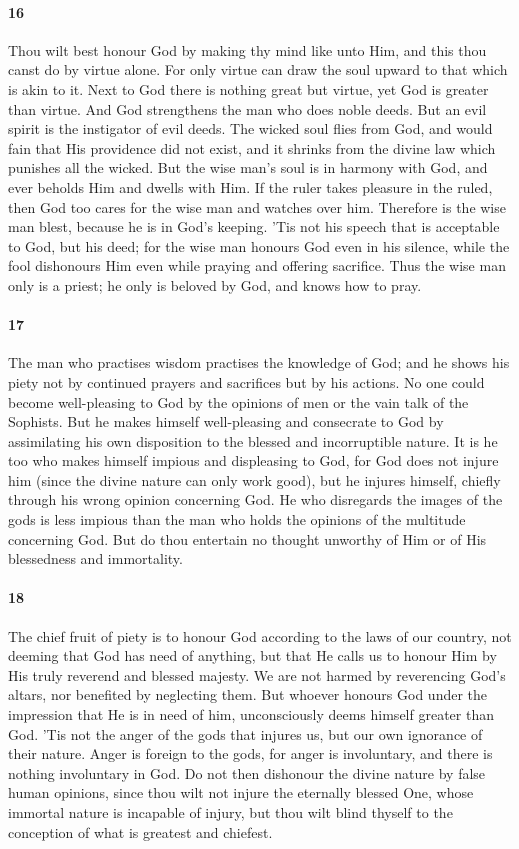 \documentclass[12pt]{article}
\begin{document}
\paragraph{16} Thou wilt best honour God by making thy mind like unto Him, and
this thou canst do by virtue alone. For only virtue can draw the soul upward to
that which is akin to it. Next to God there is nothing great but virtue, yet
God is greater than virtue. And God strengthens the man who does noble deeds.
But an evil spirit is the instigator of evil deeds. The wicked soul flies from
God, and would fain that His providence did not exist, and it shrinks from the
divine law which punishes all the wicked. But the wise man's soul is in harmony
with God, and ever beholds Him and dwells with Him. If the ruler takes pleasure
in the ruled, then God too cares for the wise man and watches over him.
Therefore is the wise man blest, because he is in God's keeping. 'Tis not his
speech that is acceptable to God, but his deed; for the wise man honours God
even in his silence, while the fool dishonours Him even while praying and
offering sacrifice. Thus the wise man only is a priest; he only is beloved by
God, and knows how to pray.

\paragraph{17} The man who practises wisdom practises the knowledge of God; and
he shows his piety not by continued prayers and sacrifices but by his actions.
No one could become well-pleasing to God by the opinions of men or the vain
talk of the Sophists. But he makes himself well-pleasing and consecrate to God
by assimilating his own disposition to the blessed and incorruptible nature. It
is he too who makes himself impious and displeasing to God, for God does not
injure him (since the divine nature can only work good), but he injures
himself, chiefly through his wrong opinion concerning God. He who disregards
the images of the gods is less impious than the man who holds the opinions of
the multitude concerning God. But do thou entertain no thought unworthy of Him
or of His blessedness and immortality.

\paragraph{18} The chief fruit of piety is to honour God according to the laws
of our country, not deeming that God has need of anything, but that He calls us
to honour Him by His truly reverend and blessed majesty. We are not harmed by
reverencing God's altars, nor benefited by neglecting them. But whoever honours
God under the impression that He is in need of him, unconsciously deems himself
greater than God. 'Tis not the anger of the gods that injures us, but our own
ignorance of their nature. Anger is foreign to the gods, for anger is
involuntary, and there is nothing involuntary in God. Do not then dishonour the
divine nature by false human opinions, since thou wilt not injure the eternally
blessed One, whose immortal nature is incapable of injury, but thou wilt blind
thyself to the conception of what is greatest and chiefest.
\end{document}
